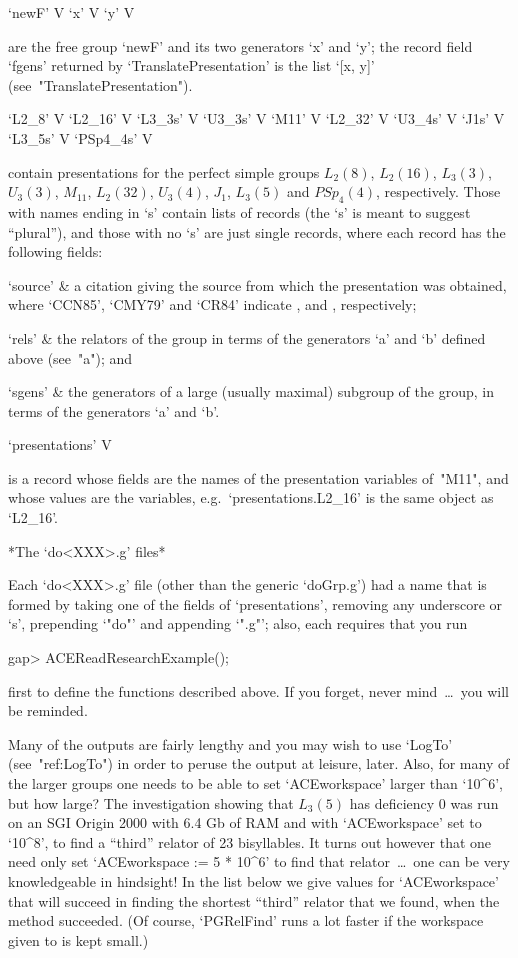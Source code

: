 \>`newF' V
\>`x' V
\>`y' V

are the free group `newF' and its two  generators  `x'  and  `y';  the
record field `fgens' returned by `TranslatePresentation' is  the  list
`[x, y]' (see~"TranslatePresentation").

\>`L2_8' V
\>`L2_16' V
\>`L3_3s' V
\>`U3_3s' V
\>`M11' V
\>`L2_32' V
\>`U3_4s' V
\>`J1s' V
\>`L3_5s' V
\>`PSp4_4s' V

contain  presentations  for  the  perfect  simple   groups   $L_2(8)$,
$L_2(16)$, $L_3(3)$, $U_3(3)$, $M_{11}$, $L_2(32)$,  $U_3(4)$,  $J_1$,
$L_3(5)$ and $PSp_4(4)$, respectively. Those with names ending in  `s'
contain lists of records (the `s' is meant to suggest ``plural''), and
those with no `s' are just single records, where each record  has  the
following fields:

\beginitems

\quad`source' & 
a citation giving the source from which the presentation was obtained,
where `CCN85', `CMY79' and `CR84' indicate \cite{CCN85},  \cite{CMY79}
and \cite{CR84}, respectively;

\quad`rels' & 
the relators of the group in terms  of  the  generators  `a'  and  `b'
defined above (see~"a"); and

\quad`sgens' & 
the generators of a large (usually maximal) subgroup of the group,  in
terms of the generators `a' and `b'.

\enditems

\>`presentations' V

is a record whose fields are the names of the  presentation  variables
of~"M11",     and     whose     values     are     the      variables,
e.g.~`presentations.L2_16' is the same object as `L2_16'.

*The `do<XXX>.g' files*

Each `do<XXX>.g' file (other than the generic `doGrp.g')  had  a  name
that is formed  by  taking  one  of  the  fields  of  `presentations',
removing any  underscore  or  `s',  prepending  `"do"'  and  appending
`".g"'; also, each requires that you run

\beginexample
gap> ACEReadResearchExample();
\endexample

first to define the functions described above. If  you  forget,  never
mind~\dots~you will be reminded.

Many of the outputs are fairly lengthy and you may wish to use `LogTo'
(see~"ref:LogTo") in order to peruse the  output  at  leisure,  later.
Also, for many of the larger groups  one  needs  to  be  able  to  set
`ACEworkspace' larger than `10^6', but how  large?  The  investigation
showing that $L_3(5)$ has deficiency 0 was run on an SGI  Origin  2000
with 6.4 Gb of RAM and with `ACEworkspace' set to `10^8',  to  find  a
``third'' relator of 23 bisyllables. It turns  out  however  that  one
need  only  set  `ACEworkspace   :=   5   *   10^6'   to   find   that
relator~\dots~one can be very knowledgeable in hindsight! In the  list
below we give values for `ACEworkspace' that will succeed  in  finding
the  shortest  ``third''  relator  that  we  found,  when  the  method
succeeded. (Of course, `PGRelFind' runs a lot faster if the  workspace
given to {\ACE} is kept small.)

